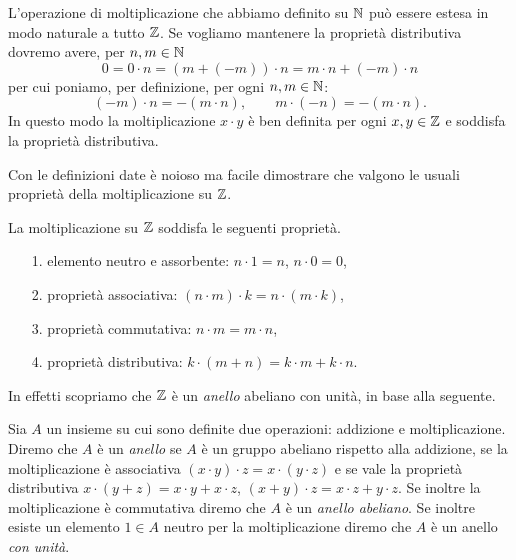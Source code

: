 L'operazione di moltiplicazione che abbiamo definito su ${\mathbb N}$ può essere 
estesa in modo naturale a tutto ${\mathbb Z}$. 
Se vogliamo mantenere la proprietà distributiva dovremo avere, 
per $n,m\in{\mathbb N}$
\[
  0 = 0 \cdot n = (m+(-m))\cdot n = m\cdot n + (-m)\cdot n
\]
per cui poniamo, per definizione, per ogni $n,m\in {\mathbb N}$:
\[
  (-m) \cdot n = -(m\cdot n), \qquad  m \cdot (-n) = -(m\cdot n).
\]
In questo modo la moltiplicazione $x\cdot y$ 
è ben definita per ogni $x,y\in {\mathbb Z}$ e soddisfa la proprietà distributiva.

Con le definizioni date è noioso ma facile dimostrare 
che valgono le usuali proprietà della
moltiplicazione su ${\mathbb Z}$.

\begin{theorem}
  La moltiplicazione su ${\mathbb Z}$ soddisfa le seguenti proprietà.
  \begin{enumerate}
    \item[1.] elemento neutro e assorbente: $n\cdot 1 = n$, $n\cdot 0 = 0$,
    \item[2.] proprietà associativa: $(n\cdot m)\cdot k = n \cdot (m\cdot k)$,
    \item[3.] proprietà commutativa: $n\cdot m = m\cdot n$,
    \item[4.] proprietà distributiva: $k\cdot(m+n) = k\cdot m + k\cdot n$. 
  \end{enumerate}
\end{theorem}

In effetti scopriamo che ${\mathbb Z}$ è un \emph{anello}%
%
 abeliano con unità, in base alla seguente.
%
\begin{definition}[anello]
  \label{def:anello}%
  Sia $A$ un insieme su cui sono definite due operazioni: 
  addizione e moltiplicazione.  
  Diremo che $A$ è un \emph{anello} se $A$ è un gruppo abeliano rispetto alla 
  addizione, 
  se la moltiplicazione è associativa $(x\cdot y)\cdot z = x\cdot (y\cdot z)$ 
  e se vale la proprietà distributiva $x\cdot(y+z) = x\cdot y + x\cdot z$,
  $(x+y)\cdot z = x\cdot z + y\cdot z$.
  Se inoltre la moltiplicazione è commutativa diremo che $A$ è un \emph{anello abeliano}.
  Se inoltre esiste un elemento $1\in A$ neutro per la moltiplicazione 
  diremo che $A$ è un anello \emph{con unità}.
\end{definition}

